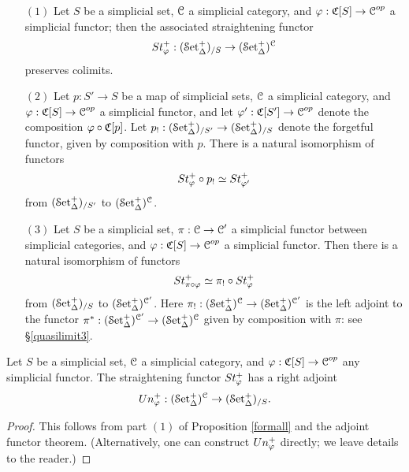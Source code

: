 \begin{proposition}\label{formall}

\begin{itemize}
\item[$(1)$] Let $S$ be a simplicial set, $\calC$ a simplicial category, and $\phi: \sCoNerve[S] \rightarrow
\calC^{op}$ a simplicial functor; then the associated straightening functor
$$\St^{+}_{\phi}: (\mSet)_{/S} \rightarrow (\mSet)^{\calC}$$ preserves colimits.

\item[$(2)$] Let $p: S' \rightarrow S$ be a map of simplicial sets, $\calC$ a simplicial category, and
$\phi: \sCoNerve[S] \rightarrow \calC^{op}$ a simplicial functor, and let $\phi': \sCoNerve[S'] \rightarrow \calC^{op}$ denote the composition $\phi \circ \sCoNerve[p]$. 
Let $p_{!}: (\mSet)_{/S'} \rightarrow (\mSet)_{/S}$ denote the forgetful functor, given by composition with $p$. There is a natural isomorphism of functors
$$ \St^{+}_{\phi} \circ p_{!} \simeq \St^{+}_{\phi'}$$
from $(\mSet)_{/S'}$ to $(\mSet)^{\calC}$.

\item[$(3)$] Let $S$ be a simplicial set, $\pi: \calC \rightarrow \calC'$ a simplicial functor between simplicial categories, and $\phi: \sCoNerve[S] \rightarrow
\calC^{op}$ a simplicial functor. Then there is a natural isomorphism of functors $$\St^{+}_{\pi \circ \phi} \simeq \pi_{!} \circ \St^{+}_{\phi}$$
from $(\mSet)_{/S}$ to $(\mSet)^{\calC'}$. Here $\pi_{!}: (\mSet)^{\calC} \rightarrow (\mSet)^{\calC'}$
is the left adjoint to the functor $\pi^{\ast}: (\mSet)^{\calC'} \rightarrow (\mSet)^{\calC}$ given by composition with $\pi$: see \S \ref{quasilimit3}.
\end{itemize}
\end{proposition}

\begin{corollary}\label{giraf}
Let $S$ be a simplicial set, $\calC$ a simplicial category, and $\phi: \sCoNerve[S] \rightarrow \calC^{op}$ any simplicial functor. The straightening functor $\St^{+}_{\phi}$ has a right adjoint 
$$\Un^{+}_{\phi}: (\mSet)^{\calC} \rightarrow (\mSet)_{/S}.$$
\end{corollary}

\begin{proof}
This follows from part $(1)$ of Proposition \ref{formall} and the adjoint functor theorem. (Alternatively, one can construct $\Un^{+}_{\phi}$ directly; we leave details to the reader.)
\end{proof}

